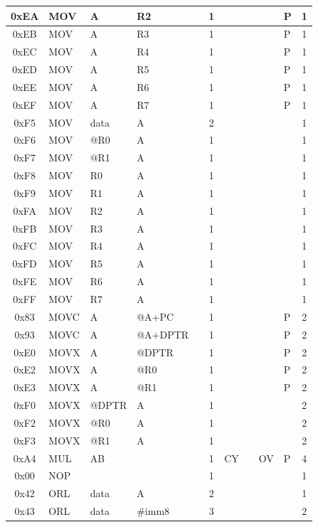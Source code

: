 \documentclass[a4paper,twoside,12pt]{book}
\begin{document}
{\begin{longtable}{|c|l|lll|c|llll|c|}
		0xEA	& MOV	& A	& R2	&	& 1	&	&	&	& P	& 1	\\\hline
		0xEB	& MOV	& A	& R3	&	& 1	&	&	&	& P	& 1	\\\hline
		0xEC	& MOV	& A	& R4	&	& 1	&	&	&	& P	& 1	\\\hline
		0xED	& MOV	& A	& R5	&	& 1	&	&	&	& P	& 1	\\\hline
		0xEE	& MOV	& A	& R6	&	& 1	&	&	&	& P	& 1	\\\hline
		0xEF	& MOV	& A	& R7	&	& 1	&	&	&	& P	& 1	\\\hline
		0xF5	& MOV	& data	& A	&	& 2	&	&	&	&	& 1	\\\hline
		0xF6	& MOV	& @R0	& A	&	& 1	&	&	&	&	& 1	\\\hline
		0xF7	& MOV	& @R1	& A	&	& 1	&	&	&	&	& 1	\\\hline
		0xF8	& MOV	& R0	& A	&	& 1	&	&	&	&	& 1	\\\hline
		0xF9	& MOV	& R1	& A	&	& 1	&	&	&	&	& 1	\\\hline
		0xFA	& MOV	& R2	& A	&	& 1	&	&	&	&	& 1	\\\hline
		0xFB	& MOV	& R3	& A	&	& 1	&	&	&	&	& 1	\\\hline
		0xFC	& MOV	& R4	& A	&	& 1	&	&	&	&	& 1	\\\hline
		0xFD	& MOV	& R5	& A	&	& 1	&	&	&	&	& 1	\\\hline
		0xFE	& MOV	& R6	& A	&	& 1	&	&	&	&	& 1	\\\hline
		0xFF	& MOV	& R7	& A	&	& 1	&	&	&	&	& 1	\\\hline
		0x83	& MOVC	& A	& @A+PC	&	& 1	&	&	&	& P	& 2	\\\hline
		0x93	& MOVC	& A	&@A+DPTR&	& 1	&	&	&	& P	& 2	\\\hline
		0xE0	& MOVX	& A	& @DPTR	&	& 1	&	&	&	& P	& 2	\\\hline
		0xE2	& MOVX	& A	& @R0	&	& 1	&	&	&	& P	& 2	\\\hline
		0xE3	& MOVX	& A	& @R1	&	& 1	&	&	&	& P	& 2	\\\hline
		0xF0	& MOVX	& @DPTR	& A	&	& 1	&	&	&	&	& 2	\\\hline
		0xF2	& MOVX	& @R0	& A	&	& 1	&	&	&	&	& 2	\\\hline
		0xF3	& MOVX	& @R1	& A	&	& 1	&	&	&	&	& 2	\\\hline
		0xA4	& MUL	& AB	&	&	& 1	& CY	&	& OV	& P	& 4	\\\hline
		0x00	& NOP	&	&	&	& 1	&	&	&	&	& 1	\\\hline
		0x42	& ORL	& data	& A	&	& 2	&	&	&	&	& 1	\\\hline
		0x43	& ORL	& data	& \#imm8&	& 3	&	&	&	&	& 2	\\\hline

\end{longtable}}
\end{document}

